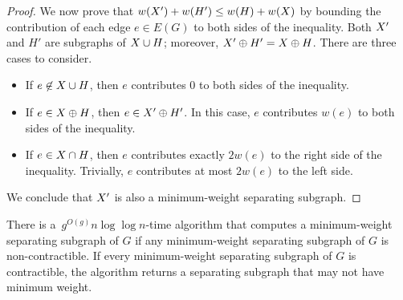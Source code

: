 \documentclass[letterpaper,review]{siamart190516}
\begin{document}
{\begin{proof}
  We now prove that $w(X') + w(H') \leq w(H) + w(X)$ by bounding the contribution of each edge $e \in E(G)$ to both sides of the inequality.  Both $X'$ and $H'$ are subgraphs of $X\cup H$; moreover, $X' \oplus H' = X \oplus H$.  There are three cases to consider.
\begin{itemize}
\item
If $e \not\in X\cup H$, then $e$ contributes $0$ to both sides of the inequality.
\item
If $e \in X \oplus H$, then $e \in X' \oplus H'$.  In this case, $e$ contributes $w(e)$ to both sides of the inequality.
\item
If $e \in X \cap H$, then $e$ contributes exactly $2w(e)$ to the right side of the inequality.  Trivially, $e$ contributes at most $2w(e)$ to the left side.
\end{itemize}
We conclude that $X'$ is also a minimum-weight separating subgraph.
\end{proof}

\begin{lemma}
\label{lem:global_split-alg}
There is a~$g^{O(g)} n \log \log n$-time algorithm that computes a minimum-weight separating subgraph of $G$ if any minimum-weight separating subgraph of $G$ is non-contractible.  If every minimum-weight separating subgraph of $G$ is contractible, the algorithm returns a separating subgraph that may not have minimum weight.
\end{lemma}

}
\end{document}
